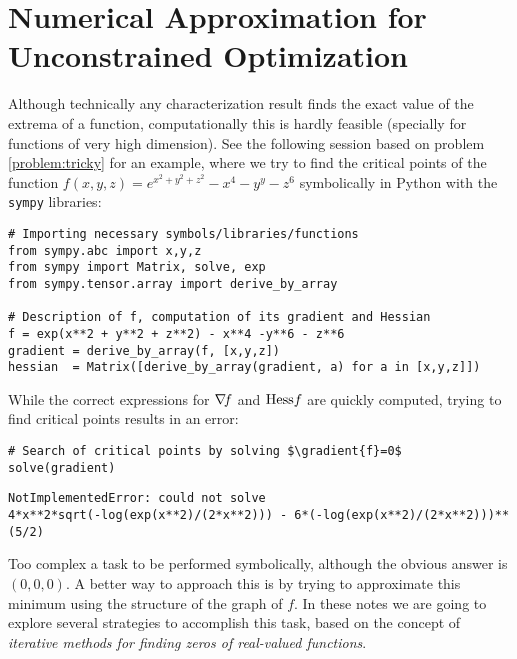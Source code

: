 
\chapter{Numerical Approximation for Unconstrained Optimization}\label{chapter:nonlinearoptimization}
Although technically any characterization result finds the exact value of the extrema of a function, computationally this is hardly feasible (specially for functions of very high dimension).  See the following session based on problem \ref{problem:tricky} for an example, where we try to find the critical points of the function $f(x,y,z)=e^{x^2+y^2+z^2}-x^4-y^y-z^6$ symbolically in Python with the \texttt{sympy} libraries:

\begin{verbatim}
# Importing necessary symbols/libraries/functions
from sympy.abc import x,y,z
from sympy import Matrix, solve, exp
from sympy.tensor.array import derive_by_array

# Description of f, computation of its gradient and Hessian
f = exp(x**2 + y**2 + z**2) - x**4 -y**6 - z**6
gradient = derive_by_array(f, [x,y,z])
hessian  = Matrix([derive_by_array(gradient, a) for a in [x,y,z]])
\end{verbatim}
While the correct expressions for $\mathop{\nabla\! {f}}$ and $\mathop{\mathrm{Hess}{f}}$ are quickly computed, trying to find critical points results in an error:
\begin{verbatim}
# Search of critical points by solving $\gradient{f}=0$
solve(gradient)
\end{verbatim}

\begin{verbatim}
NotImplementedError: could not solve 
4*x**2*sqrt(-log(exp(x**2)/(2*x**2))) - 6*(-log(exp(x**2)/(2*x**2)))**(5/2)
\end{verbatim}

Too complex a task to be performed symbolically, although the obvious answer is $(0,0,0)$.  A better way to approach this is by trying to approximate this minimum using the structure of the graph of $f$.  In these notes we are going to explore several strategies to accomplish this task, based on the concept of \emph{iterative methods for finding zeros of real-valued functions}.


